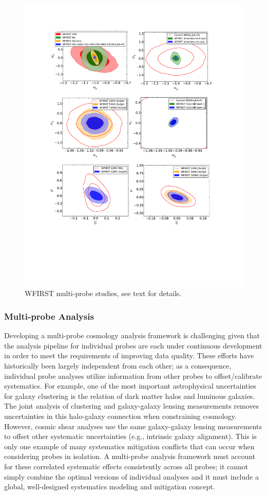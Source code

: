 \begin{figure}
\includegraphics[width=15cm]{Plots/forecasts/multi}
\caption{WFIRST multi-probe studies, see text for details.}
\label{fi:multi}
\end{figure}

\subsubsection{\CoLi Multi-probe Analysis} Developing a multi-probe cosmology analysis framework is challenging given that the analysis pipeline for individual probes are each under continuous
development in order to meet the requirements of improving data quality. These
efforts have historically been largely independent from each other; as a
consequence, individual probe analyses utilize information from other probes to
offset/calibrate systematics. For example, one of the most important
astrophysical uncertainties for galaxy clustering is the relation of dark matter
halos and luminous galaxies. The joint analysis of clustering and galaxy-galaxy
lensing measurements removes uncertainties in this halo-galaxy connection when
constraining cosmology. However, cosmic shear analyses use the same
galaxy-galaxy lensing measurements to offset other systematic uncertainties
(e.g., intrinsic galaxy alignment). This is only one example of many systematics
mitigation conflicts that can occur when considering probes in isolation. A
multi-probe analysis framework must account for these correlated systematic
effects consistently across all probes; it cannot simply combine the optimal
versions of individual analyses and it must include a global, well-designed
systematics modeling and mitigation concept.

